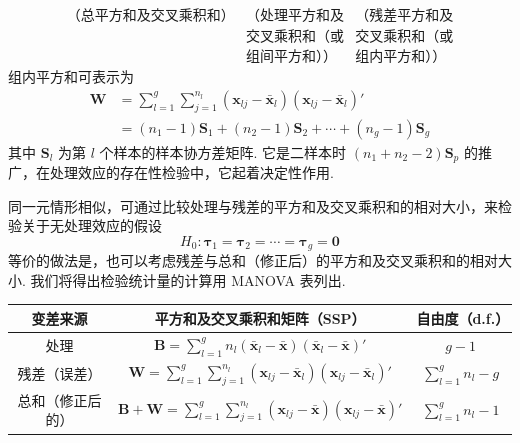\[
\begin{array}{ccc}
\text{（总平方和及交叉乘积和）} & \text{（处理平方和及} & \text{（残差平方和及}\\
& \text{交叉乘积和（或} & \text{交叉乘积和（或}\\
& \text{组间平方和））} & \text{组内平方和））}
\end{array}
\]
组内平方和可表示为
\label{eq:6-41}
\begin{equation}
\begin{aligned}
\mathbf{W}&=\sum_{l=1}^g\sum_{j=1}^{n_l}(\mathbf{x}_{lj}-\bar{\mathbf{x}}_l)(\mathbf{x}_{lj}-\bar{\mathbf{x}}_l)'\\
&=(n_1-1)\mathbf{S}_1+(n_2-1)\mathbf{S}_2+\cdots+(n_g-1)\mathbf{S}_g
\end{aligned}
\tag{6-41}
\end{equation}
其中 $\mathbf{S}_l$ 为第 $l$ 个样本的样本协方差矩阵. 它是二样本时 $(n_1+n_2-2)\mathbf{S}_p$ 的推广，在处理效应的存在性检验中，它起着决定性作用.

同一元情形相似，可通过比较处理与残差的平方和及交叉乘积和的相对大小，来检验关于无处理效应的假设
\[
H_0: \boldsymbol{\tau}_1=\boldsymbol{\tau}_2=\cdots=\boldsymbol{\tau}_g=\mathbf{0}
\]
等价的做法是，也可以考虑残差与总和（修正后）的平方和及交叉乘积和的相对大小. 我们将得出检验统计量的计算用 MANOVA 表列出.

\begin{mvtable}
\begin{tabular}{ccc}
\toprule
变差来源 & 平方和及交叉乘积和矩阵（SSP） & 自由度（d.f.）\\
\midrule
处理 & $\mathbf{B}=\sum\limits_{l=1}^g n_l(\bar{\mathbf{x}}_l-\bar{\mathbf{x}})(\bar{\mathbf{x}}_l-\bar{\mathbf{x}})'$ & $g-1$\\
残差（误差） & $\mathbf{W}=\sum\limits_{l=1}^g\sum\limits_{j=1}^{n_l}(\mathbf{x}_{lj}-\bar{\mathbf{x}}_l)(\mathbf{x}_{lj}-\bar{\mathbf{x}}_l)'$ & $\sum\limits_{l=1}^g n_l-g$\\
\midrule
总和（修正后的） & $\mathbf{B}+\mathbf{W}=\sum\limits_{l=1}^g\sum\limits_{j=1}^{n_l}(\mathbf{x}_{lj}-\bar{\mathbf{x}})(\mathbf{x}_{lj}-\bar{\mathbf{x}})'$ & $\sum\limits_{l=1}^g n_l-1$\\
\bottomrule
\end{tabular}
\end{mvtable}
